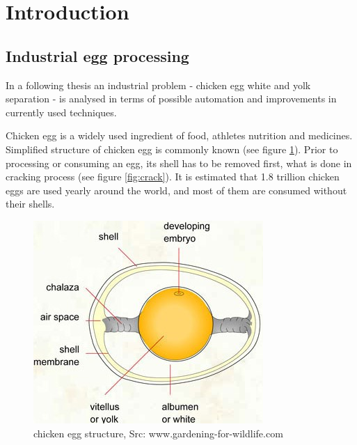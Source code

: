 \documentclass[12pt,twoside,a4paper]{article}
\begin{document}
\tableofcontents


\section{Introduction}
\subsection{Industrial egg processing}
In a following thesis an industrial problem - chicken egg white and yolk separation - is analysed in terms of possible automation and improvements in currently used techniques.

Chicken egg is a widely used ingredient of food, athletes nutrition and medicines. Simplified structure of chicken egg is commonly known (see figure \ref{fig:structure}). Prior to processing or consuming an egg, its shell has to be removed first, what is done in cracking process (see figure \ref{fig:crack}). It is estimated that 1.8 trillion chicken eggs are used yearly around the world\cite{trillion}, and most of them are consumed without their shells. 

\begin{figure}[H]
\centering
\includegraphics[width=0.4\paperwidth]{structure}
\caption{chicken egg structure, Src: www.gardening-for-wildlife.com}\label{fig:structure}\label{fig:structure}
\end{figure}
\end{document}
